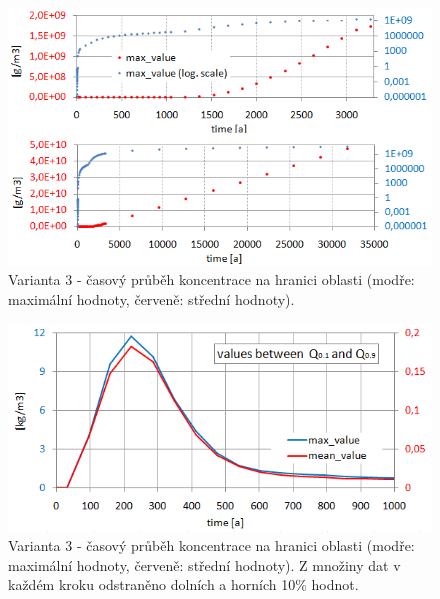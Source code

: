 \documentclass[11pt,a4paper]{article}
\begin{document}
\begin{onehalfspacing}
\begin{figure}[H]
\centering
\includegraphics{graphics/obr_ralek/var3/hranice_max_var3.png}
\caption{Varianta 3 - časový průběh koncentrace na hranici oblasti (modře: maximální hodnoty, červeně: střední hodnoty).}
\label{hranice_max_var3}
\end{figure}

\begin{figure}[H]
\centering
\includegraphics{graphics/obr_ralek/var3/var3_hranice_max_orez.PNG}
\caption{Varianta 3 - časový průběh koncentrace na hranici oblasti (modře: maximální hodnoty, červeně: střední hodnoty). Z množiny dat v každém kroku odstraněno dolních a horních 10\% hodnot.}
\label{hranice_max_orez}
\end{figure}

\newpage

\end{onehalfspacing}
\end{document}
